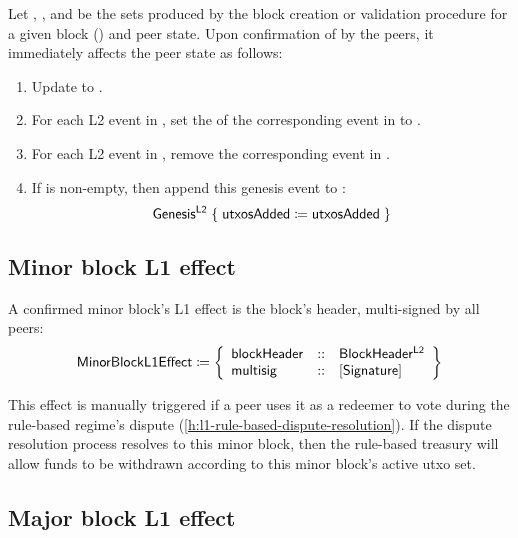 \documentclass[../hydrozoa.tex]{subfiles}
\begin{document}
Let , , and  be the sets produced by the block creation or validation procedure for a given block () and peer state.
Upon confirmation of  by the peers, it immediately affects the peer state as follows:
\begin{enumerate}
  \item Update  to .
  \item For each L2 event in , set the  of the corresponding event in  to .
  \item For each L2 event in , remove the corresponding event in .
  \item If  is non-empty, then append this genesis event to :
    \begin{equation*}
      \mathsf{Genesis^{L2}} \;\{\; \mathsf{utxosAdded} \coloneq \mathsf{utxosAdded} \;\}
    \end{equation*}
\end{enumerate}

\subsection{Minor block L1 effect}%
\label{h:l2-block-effect-minor-block}%

A confirmed minor block's L1 effect is the block's header, multi-signed by all peers:
\begin{equation*}
  \mathsf{MinorBlockL1Effect} \coloneq \left\{
    \begin{array}{lll}
      \mathsf{blockHeader} &::& \mathsf{BlockHeader^{L2}} \\
      \mathsf{multisig} &::& [\mathsf{Signature}]
    \end{array}\right\}
\end{equation*}

This effect is manually triggered if a peer uses it as a redeemer to vote during the rule-based regime's dispute (\cref{h:l1-rule-based-dispute-resolution}).
If the dispute resolution process resolves to this minor block, then the rule-based treasury will allow funds to be withdrawn according to this minor block's active utxo set.

\subsection{Major block L1 effect}%
\label{h:l2-block-effect-major-block}%
\end{document}
